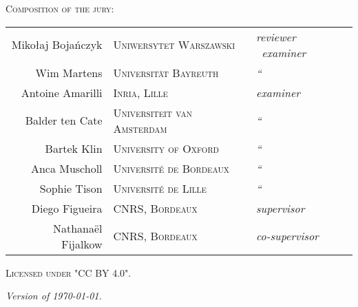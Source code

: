 \newpage
\thispagestyle{empty}
~
\newpage
\thispagestyle{empty}
\begin{fullwidth}
	\setlength{\parindent}{0pt}
	~\vfill
	\begin{center}
		\normalfont\Large\scshape Composition of the jury:\\[1.5em]
		\normalfont
		\begin{tabular}{r@{\hskip 1em}l@{\hskip 1em}l}
		  Mikołaj Bojańczyk & \textsc{\small Uniwersytet Warszawski} & \emph{reviewer \fancyand\ examiner}\\
		  Wim Martens & \textsc{\small Universität Bayreuth} & \emph{\hphantom{revi}``} \\[.5em]
		  Antoine Amarilli & \textsc{\small Inria, Lille} & \emph{examiner}\\
		  Balder ten Cate & \textsc{\small Universiteit van Amsterdam} & \emph{\hphantom{revi}``}\\
		  Bartek Klin & \textsc{\small University of Oxford} & \emph{\hphantom{revi}``}\\
		  Anca Muscholl & \textsc{\small Université de Bordeaux} & \emph{\hphantom{revi}``}\\
		  Sophie Tison & \textsc{\small Université de Lille} & \emph{\hphantom{revi}``}\\[.5em]
		  Diego Figueira & \textsc{\small CNRS, Bordeaux} & \emph{supervisor}\\
		  Nathanaël Fijalkow & \textsc{\small CNRS, Bordeaux} & \emph{co-supervisor}
		\end{tabular}
	\end{center}

	\vfill

	\par\textsc{Licensed under "CC BY 4.0".}
	\par\textit{Version of \today.}
\end{fullwidth}
